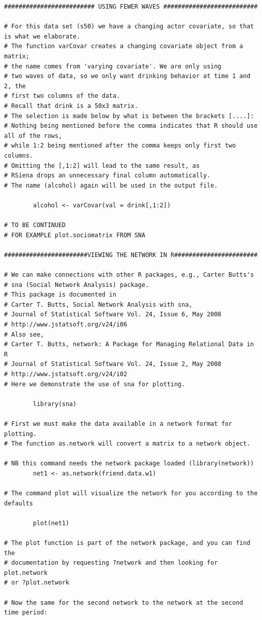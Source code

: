 \documentclass[a4paper,fleqn]{article}
\newcommand{\+}{\, + \,}
\begin{document}
{\begin{verbatim}
######################### USING FEWER WAVES ##########################

# For this data set (s50) we have a changing actor covariate, so that is what we elaborate.
# The function varCovar creates a changing covariate object from a matrix;
# the name comes from 'varying covariate'. We are only using
# two waves of data, so we only want drinking behavior at time 1 and 2, the
# first two columns of the data.
# Recall that drink is a 50x3 matrix.
# The selection is made below by what is between the brackets [....]:
# Nothing being mentioned before the comma indicates that R should use all of the rows,
# while 1:2 being mentioned after the comma keeps only first two columns.
# Omitting the [,1:2] will lead to the same result, as
# RSiena drops an unnecessary final column automatically.
# The name (alcohol) again will be used in the output file.

        alcohol <- varCovar(val = drink[,1:2])

# TO BE CONTINUED
# FOR EXAMPLE plot.sociomatrix FROM SNA

#######################VIEWING THE NETWORK IN R#######################

# We can make connections with other R packages, e.g., Carter Butts's
# sna (Social Network Analysis) package.
# This package is documented in
# Carter T. Butts, Social Network Analysis with sna,
# Journal of Statistical Software Vol. 24, Issue 6, May 2008
# http://www.jstatsoft.org/v24/i06
# Also see,
# Carter T. Butts, network: A Package for Managing Relational Data in R
# Journal of Statistical Software Vol. 24, Issue 2, May 2008
# http://www.jstatsoft.org/v24/i02
# Here we demonstrate the use of sna for plotting.

        library(sna)

# First we must make the data available in a network format for plotting.
# The function as.network will convert a matrix to a network object.

# NB this command needs the network package loaded (library(network))
        net1 <- as.network(friend.data.w1)

# The command plot will visualize the network for you according to the defaults

        plot(net1)

# The plot function is part of the network package, and you can find the
# documentation by requesting ?network and then looking for plot.network
# or ?plot.network

# Now the same for the second network to the network at the second time period:


\end{verbatim}}
\end{document}
